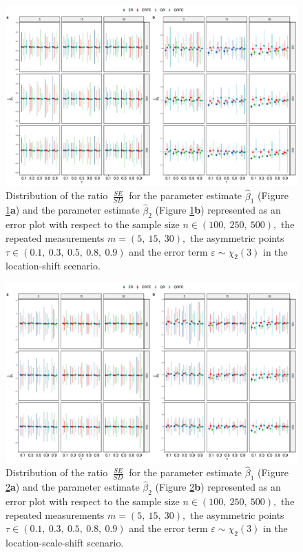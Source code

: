 \documentclass[15pt,a4paper]{article}
\DeclareMathOperator{\SE}{\textit{SE}}
\DeclareMathOperator{\SD}{\textit{SD}}
\begin{document}
\begin{center}
\begin{figure}[hbt!]
\includegraphics[width=0.75\linewidth]{Graph_supp/SdSe_chi2_homo}
    \caption{Distribution of the ratio $\frac{\SE}{\SD}$ for the parameter estimate $\widehat{\beta}_1$ (Figure \ref{fig:SdSe_chi2_homo}\textbf{a}) and the parameter estimate $\widehat{\beta}_2$ (Figure \ref{fig:SdSe_chi2_homo}\textbf{b}) represented as an error plot with respect to the sample size $n\in(100,  \ 250,  \ 500),$ the repeated measurements $m=(5,\ 15,\ 30),$ the asymmetric points $\tau\in (0.1,  \ 0.3,  \  0.5, \  0.8,\ 0.9)$ and the error term $\varepsilon\sim\chi_2(3)$ in the location-shift scenario.} \label{fig:SdSe_chi2_homo}
\end{figure}
\end{center}

\begin{center}
\begin{figure}[hbt!]
\includegraphics[width=0.75\linewidth]{Graph_supp/SdSe_chi2_hetero}
    \caption{Distribution of the ratio $\frac{\SE}{\SD}$ for the parameter estimate $\widehat{\beta}_1$ (Figure \ref{fig:SdSe_chi2_hetero}\textbf{a}) and the parameter estimate $\widehat{\beta}_2$ (Figure \ref{fig:SdSe_chi2_hetero}\textbf{b}) represented as an error plot with respect to the sample size $n\in(100,  \ 250,  \ 500),$ the repeated measurements $m=(5,\ 15,\ 30),$ the asymmetric points $\tau\in (0.1,  \ 0.3,  \  0.5, \  0.8,\ 0.9)$ and the error term $\varepsilon\sim\chi_2(3)$ in the location-scale-shift scenario.} \label{fig:SdSe_chi2_hetero}
\end{figure}
\end{center}

\clearpage


\end{document}
